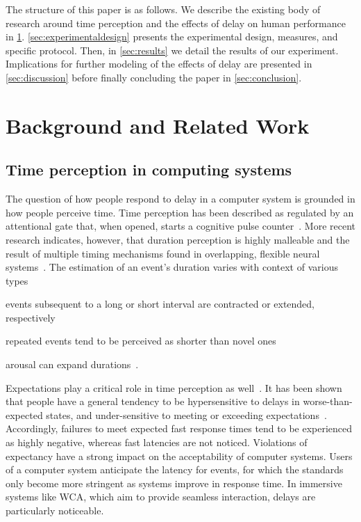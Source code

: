 \documentclass[10pt,letterpaper]{article}
\begin{document}
The structure of this paper is as follows.
We describe the existing body of research around time perception and the effects of delay on human performance in \cref{sec:background}.
\cref{sec:experimentaldesign} presents the experimental design, measures, and specific protocol.
Then, in \cref{sec:results} we detail the results of our experiment.
Implications for further modeling of the effects of delay are presented in \cref{sec:discussion} before finally concluding the paper in \cref{sec:conclusion}.

\section{Background and Related Work}\label{sec:background}
\subsection{Time perception in computing systems}

The question of how people respond to delay in a computer system is grounded in how people perceive time.
Time perception has been described as regulated by an attentional gate that, when opened, starts a cognitive pulse counter~\autocite{zakay1995attentional,zakay1996role}.
More recent research indicates, however, that duration perception is highly malleable and the result of multiple timing mechanisms found in overlapping, flexible neural systems~\autocite{bruno2016multiple,wiener2011multiple}. 
The estimation of an event's duration varies with context of various types
\begin{enumerate*}[label={(\roman*)}, before=\unskip{: }, itemjoin={{; }}, itemjoin*={{; and }}]
    \item events subsequent to a long or short interval are contracted or extended, respectively~\autocite{heron2012duration}
    \item repeated events tend to be perceived as shorter than novel ones~\autocite{matthews2011stimulus}
    \item arousal can expand durations~\autocite{droit2011emotion}.
\end{enumerate*}

Expectations play a critical role in time perception as well~\autocite{zakay1995attentional,zakay1996role}.
It has been shown that people have a general tendency to be hypersensitive to delays in worse-than-expected states, and under-sensitive to meeting or exceeding expectations~\autocite{Loewenstein1992anomaliesintertemporalchoice}.
Accordingly, failures to meet expected fast response times tend to be experienced as highly negative, whereas fast latencies are not noticed.
Violations of expectancy have a strong impact on the acceptability of computer systems.
Users of a computer system anticipate the latency for events, for which the standards only become more stringent as systems improve in response time.
In immersive systems like WCA, which aim to provide seamless interaction, delays are particularly noticeable.
\end{document}

